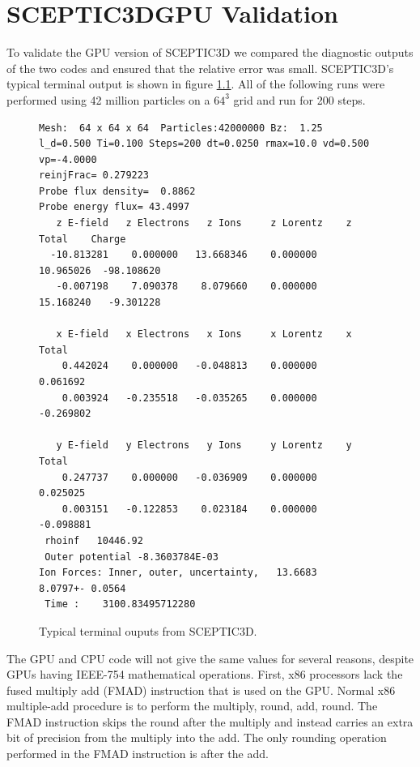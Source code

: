 \chapter{SCEPTIC3DGPU Validation}

To validate the GPU version of SCEPTIC3D we compared the diagnostic outputs of the two codes and ensured that the relative error was small. SCEPTIC3D's typical terminal output is shown in figure \ref{fig:term_output}. All of the following runs were performed using 42 million particles on a $64^3$ grid and run for 200 steps. 

\begin{figure}
\begin{lstlisting}[frame=single]
Mesh:  64 x 64 x 64  Particles:42000000 Bz:  1.25
l_d=0.500 Ti=0.100 Steps=200 dt=0.0250 rmax=10.0 vd=0.500 vp=-4.0000
reinjFrac= 0.279223
Probe flux density=  0.8862
Probe energy flux= 43.4997
   z E-field   z Electrons   z Ions     z Lorentz    z Total    Charge
  -10.813281    0.000000   13.668346    0.000000   10.965026  -98.108620
   -0.007198    7.090378    8.079660    0.000000   15.168240   -9.301228
 
   x E-field   x Electrons   x Ions     x Lorentz    x Total
    0.442024    0.000000   -0.048813    0.000000    0.061692
    0.003924   -0.235518   -0.035265    0.000000   -0.269802
 
   y E-field   y Electrons   y Ions     y Lorentz    y Total
    0.247737    0.000000   -0.036909    0.000000    0.025025
    0.003151   -0.122853    0.023184    0.000000   -0.098881
 rhoinf   10446.92    
 Outer potential -8.3603784E-03
Ion Forces: Inner, outer, uncertainty,   13.6683    8.0797+- 0.0564
 Time :    3100.83495712280    
\end{lstlisting}
\vspace{-0.4in}
\caption{Typical terminal ouputs from SCEPTIC3D.}
\label{fig:term_output}
\end{figure}

The GPU and CPU code will not give the same values for several reasons, despite GPUs having IEEE-754 mathematical operations. First, x86 processors lack the fused multiply add (FMAD) instruction that is used on the GPU. Normal x86 multiple-add procedure is to perform the multiply, round, add, round. The FMAD instruction skips the round after the multiply and instead carries an extra bit of precision from the multiply into the add. The only rounding operation performed in the FMAD instruction is after the add. \cite{Whitehead2011}

